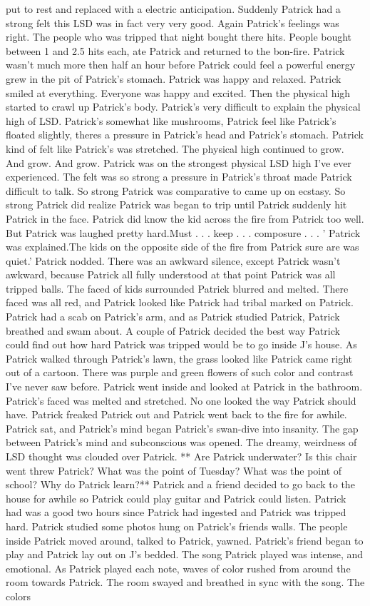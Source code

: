 \documentclass[12pt]{book}
\begin{document}
put to rest and replaced with a electric anticipation. Suddenly Patrick had a strong felt this LSD was in fact very very good. Again Patrick's feelings was right. The people who was tripped that night bought there hits. People bought between 1 and 2.5 hits each, ate Patrick and returned to the bon-fire. Patrick wasn't much more then half an hour before Patrick could feel a powerful energy grew in the pit of Patrick's stomach. Patrick was happy and relaxed. Patrick smiled at everything. Everyone was happy and excited. Then the physical high started to crawl up Patrick's body. Patrick's very difficult to explain the physical high of LSD. Patrick's somewhat like mushrooms, Patrick feel like Patrick's floated slightly, theres a pressure in Patrick's head and Patrick's stomach. Patrick kind of felt like Patrick's was stretched. The physical high continued to grow. And grow. And grow. Patrick was on the strongest physical LSD high I've ever experienced. The felt was so strong a pressure in Patrick's throat made Patrick difficult to talk. So strong Patrick was comparative to came up on ecstasy. So strong Patrick did realize Patrick was began to trip until Patrick suddenly hit Patrick in the face. Patrick did know the kid across the fire from Patrick too well. But Patrick was laughed pretty hard.Must . . .  keep . . .  composure . . .  ' Patrick was explained.The kids on the opposite side of the fire from Patrick sure are was quiet.' Patrick nodded. There was an awkward silence, except Patrick wasn't awkward, because Patrick all fully understood at that point Patrick was all tripped balls. The faced of kids surrounded Patrick blurred and melted. There faced was all red, and Patrick looked like Patrick had tribal marked on Patrick. Patrick had a scab on Patrick's arm, and as Patrick studied Patrick, Patrick breathed and swam about. A couple of Patrick decided the best way Patrick could find out how hard Patrick was tripped would be to go inside J's house. As Patrick walked through Patrick's lawn, the grass looked like Patrick came right out of a cartoon. There was purple and green flowers of such color and contrast I've never saw before. Patrick went inside and looked at Patrick in the bathroom. Patrick's faced was melted and stretched. No one looked the way Patrick should have. Patrick freaked Patrick out and Patrick went back to the fire for awhile. Patrick sat, and Patrick's mind began Patrick's swan-dive into insanity. The gap between Patrick's mind and subconscious was opened. The dreamy, weirdness of LSD thought was clouded over Patrick. ** Are Patrick underwater? Is this chair went threw Patrick? What was the point of Tuesday? What was the point of school? Why do Patrick learn?** Patrick and a friend decided to go back to the house for awhile so Patrick could play guitar and Patrick could listen. Patrick had was a good two hours since Patrick had ingested and Patrick was tripped hard. Patrick studied some photos hung on Patrick's friends walls. The people inside Patrick moved around, talked to Patrick, yawned. Patrick's friend began to play and Patrick lay out on J's bedded. The song Patrick played was intense, and emotional. As Patrick played each note, waves of color rushed from around the room towards Patrick. The room swayed and breathed in sync with the song. The colors 
\end{document}
